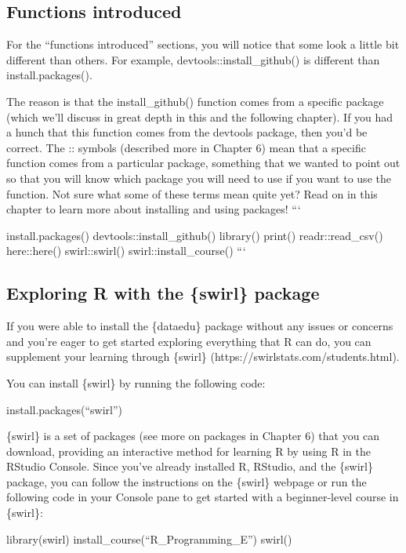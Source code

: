 \documentclass[
  letterpaper,
  DIV=11,
  numbers=noendperiod]{scrreprt}
\begin{document}
\subsection{Functions introduced}\label{functions-introduced}

For the ``functions introduced'' sections, you will notice that some
look a little bit different than others. For example,
devtools::install\_github() is different than install.packages().

The reason is that the install\_github() function comes from a specific
package (which we'll discuss in great depth in this and the following
chapter). If you had a hunch that this function comes from the devtools
package, then you'd be correct. The :: symbols (described more in
Chapter 6) mean that a specific function comes from a particular
package, something that we wanted to point out so that you will know
which package you will need to use if you want to use the function. Not
sure what some of these terms mean quite yet? Read on in this chapter to
learn more about installing and using packages! ```

install.packages() devtools::install\_github() library() print()
readr::read\_csv() here::here() swirl::swirl() swirl::install\_course()
```

\subsection{Exploring R with the \{swirl\}
package}\label{exploring-r-with-the-swirl-package}

If you were able to install the \{dataedu\} package without any issues
or concerns and you're eager to get started exploring everything that R
can do, you can supplement your learning through \{swirl\}
(https://swirlstats.com/students.html).

You can install \{swirl\} by running the following code:

install.packages(``swirl'')

\{swirl\} is a set of packages (see more on packages in Chapter 6) that
you can download, providing an interactive method for learning R by
using R in the RStudio Console. Since you've already installed R,
RStudio, and the \{swirl\} package, you can follow the instructions on
the \{swirl\} webpage or run the following code in your Console pane to
get started with a beginner-level course in \{swirl\}:

library(swirl) install\_course(``R\_Programming\_E'') swirl()
\end{document}
